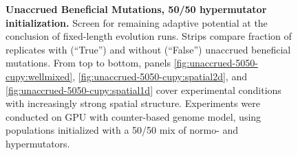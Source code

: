 \begin{figure}[h]
  \begin{minipage}{\textwidth}
    \caption{%
      \textbf{Unaccrued Beneficial Mutations, 50/50 hypermutator initialization.}
      \footnotesize
      Screen for remaining adaptive potential at the conclusion of fixed-length evolution runs.
      Strips compare fraction of replicates with (``True'') and without (``False'') unaccrued beneficial mutations.
      From top to bottom, panels \ref{fig:unaccrued-5050-cupy:wellmixed}, \ref{fig:unaccrued-5050-cupy:spatial2d}, and \ref{fig:unaccrued-5050-cupy:spatial1d} cover experimental conditions with increasingly strong spatial structure.
      Experiments were conducted on GPU with counter-based genome model, using populations initialized with a 50/50 mix of normo- and hypermutators.
    }
    \label{fig:unaccrued-5050-cupy}
  \end{minipage}
\end{figure}
